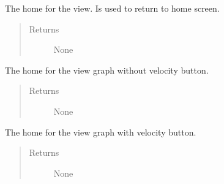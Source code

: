 \documentclass[letterpaper,10pt,english]{sphinxmanual}
\begin{document}
\begin{fulllineitems}
\begin{fulllineitems}
\begin{quote}
\begin{description}
\end{description}\end{quote}

\end{fulllineitems}


\begin{fulllineitems}
\label{\detokenize{index:src.Views.View_ReportScreen.ReportWindow.del_BtnHome}}
The home for the view. Is used to return to home screen.
\begin{quote}\begin{description}
\item[{Returns}] \leavevmode
None

\end{description}\end{quote}

\end{fulllineitems}


\begin{fulllineitems}
\label{\detokenize{index:src.Views.View_ReportScreen.ReportWindow.del_BtnViewGraphNoVelocity}}
The home for the view graph without velocity button.
\begin{quote}\begin{description}
\item[{Returns}] \leavevmode
None

\end{description}\end{quote}

\end{fulllineitems}


\begin{fulllineitems}
\label{\detokenize{index:src.Views.View_ReportScreen.ReportWindow.del_BtnViewGraphVelocity}}
The home for the view graph with velocity button.
\begin{quote}\begin{description}
\item[{Returns}] \leavevmode
None


\end{description}
\end{quote}
\end{fulllineitems}
\end{fulllineitems}
\end{document}
